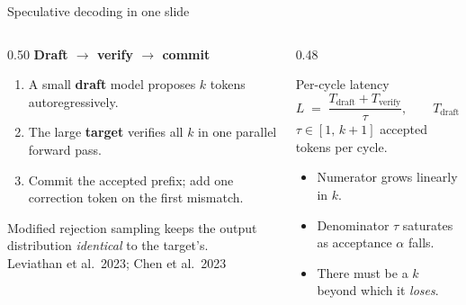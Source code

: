 \documentclass[aspectratio=169, 11pt]{beamer}
\begin{document}
\begin{frame}{Speculative decoding in one slide}
  \begin{columns}[T,onlytextwidth]
    \begin{column}{0.50\textwidth}
      \textbf{Draft $\to$ verify $\to$ commit}
      \begin{enumerate}\itemsep2pt
        \item A small \textbf{draft} model proposes $k$ tokens
              autoregressively.
        \item The large \textbf{target} verifies all $k$ in
              \alert{one} parallel forward pass.
        \item Commit the accepted prefix; add one correction token on the
              first mismatch.
      \end{enumerate}
      \vspace{3pt}
      Modified rejection sampling keeps the output distribution
      \emph{identical} to the target's.
      \\[2pt]
      \tiny Leviathan et al.\ 2023; Chen et al.\ 2023
    \end{column}
    \begin{column}{0.48\textwidth}
      \begin{block}{Per-cycle latency}
        \[
          L \;=\; \frac{T_{\text{draft}} + T_{\text{verify}}}{\tau},
          \qquad
          T_{\text{draft}} = k \cdot t_{\text{draft step}}
        \]
        $\tau \in [1,\,k{+}1]$ accepted tokens per cycle.
      \end{block}
      \vspace{-2pt}
      \begin{itemize}\itemsep2pt
        \item Numerator grows \alert{linearly} in $k$.
        \item Denominator $\tau$ saturates as acceptance $\alpha$ falls.
        \item[$\Rightarrow$] There must be a $k$ beyond which it \emph{loses}.
      \end{itemize}
    \end{column}
  \end{columns}
\end{frame}
\end{document}
